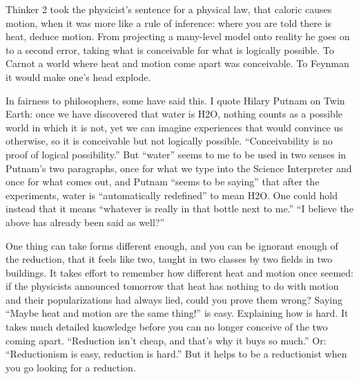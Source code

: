 Thinker 2 took the physicist's sentence for a physical law, that caloric causes motion, when it was more like a rule of inference: where you are told there is heat, deduce motion. From projecting a many-level model onto reality he goes on to a second error, taking what is conceivable for what is logically possible. To Carnot a world where heat and motion come apart was conceivable. To Feynman it would make one's head explode. 

In fairness to philosophers, some have said this. I quote Hilary Putnam on Twin Earth: once we have discovered that water is H2O, nothing counts as a possible world in which it is not, yet we can imagine experiences that would convince us otherwise, so it is conceivable but not logically possible. ``Conceivability is no proof of logical possibility.'' But ``water'' seems to me to be used in two senses in Putnam's two paragraphs, once for what we type into the Science Interpreter and once for what comes out, and Putnam ``seems to be saying'' that after the experiments, water is ``automatically redefined'' to mean H2O. One could hold instead that it means ``whatever is really in that bottle next to me.''  ``I believe the above has already been said as well?'' 

One thing can take forms different enough, and you can be ignorant enough of the reduction, that it feels like two, taught in two classes by two fields in two buildings. It takes effort to remember how different heat and motion once seemed: if the physicists announced tomorrow that heat has nothing to do with motion and their popularizations had always lied, could you prove them wrong? Saying ``Maybe heat and motion are the same thing!'' is easy. Explaining how is hard. It takes much detailed knowledge before you can no longer conceive of the two coming apart. ``Reduction isn't cheap, and that's why it buys so much.'' Or: ``Reductionism is easy, reduction is hard.'' But it helps to be a reductionist when you go looking for a reduction.
